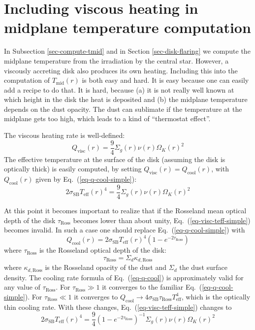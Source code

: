 \documentclass{book}
\begin{document}
\section{Including viscous heating in midplane temperature computation}
\label{sec-viscous-heating}
%
In Subsection \ref{sec-compute-tmid} and in Section \ref{sec-disk-flaring}
we compute the midplane temperature from the irradiation by the central
star. However, a viscously accreting disk also produces its own heating.
Including this into the computation of $T_{\mathrm{mid}}(r)$ is both easy
and hard. It is easy because one can easily add a recipe to do that. It
is hard, because (a) it is not really well known at which height in the
disk the heat is deposited and (b) the midplane temperature depends on
the dust opacity. The dust can sublimate if the temperature at the
midplane gets too high, which leads to a kind of ``thermostat effect''.

The viscous heating rate is well-defined:
\begin{equation}
Q_{\mathrm{visc}}(r) = \frac{9}{4}\Sigma_g(r)\nu(r)\Omega_K(r)^2
\end{equation}
The effective temperature at the surface of the disk (assuming the
disk is optically thick) is easily computed, by setting
$Q_{\mathrm{visc}}(r)=Q_{\mathrm{cool}}(r)$, with $Q_{\mathrm{cool}}(r)$ given
by Eq.~(\ref{eq-q-cool-simple}):
\begin{equation}\label{eq-visc-teff-simple}
2\sigma_{\mathrm{SB}}T_{\mathrm{eff}}(r)^4 = \frac{9}{4}\Sigma_g(r)\nu(r)\Omega_K(r)^2
\end{equation}

At this point it becomes important to realize that if the Rosseland mean optical
depth of the disk $\tau_{\mathrm{Ross}}$ becomes lower than about unity,
Eq.~(\ref{eq-visc-teff-simple}) becomes invalid. In such a case one should
replace Eq.~(\ref{eq-q-cool-simple}) with
\begin{equation}\label{eq-q-cool}
  Q_{\mathrm{cool}}(r) = 2 \sigma_{\mathrm{SB}} T_{\mathrm{eff}}(r)^4
  \left(1-e^{-2\tau_{\mathrm{Ross}}}\right)
\end{equation}
where $\tau_{\mathrm{Ross}}$ is the Rosseland optical depth of the disk:
\begin{equation}
\tau_{\mathrm{Ross}} = \Sigma_d \kappa_{d,\mathrm{Ross}}
\end{equation}
where $\kappa_{d,\mathrm{Ross}}$ is the Rosseland opacity of the dust and
$\Sigma_d$ the dust surface density.  The cooling rate formula of
Eq.~(\ref{eq-q-cool}) is approximately valid for any value of
$\tau_{\mathrm{Ross}}$. For $\tau_{\mathrm{Ross}}\gg 1$ it converges to the
familiar Eq.~(\ref{eq-q-cool-simple}). For $\tau_{\mathrm{Ross}}\ll 1$ it
converges to $Q_{\mathrm{cool}}\rightarrow
4\sigma_{\mathrm{SB}}\tau_{\mathrm{Ross}}T_{\mathrm{eff}}^4$, which is the
optically thin cooling rate. With these changes, Eq.~(\ref{eq-visc-teff-simple})
changes to
\begin{equation}\label{eq-visc-teff}
  2\sigma_{\mathrm{SB}}T_{\mathrm{eff}}(r)^4 = \frac{9}{4}\left(1-e^{-2\tau_{\mathrm{Ross}}}\right)^{-1}\Sigma_g(r)\nu(r)\Omega_K(r)^2
\end{equation}
\end{document}
